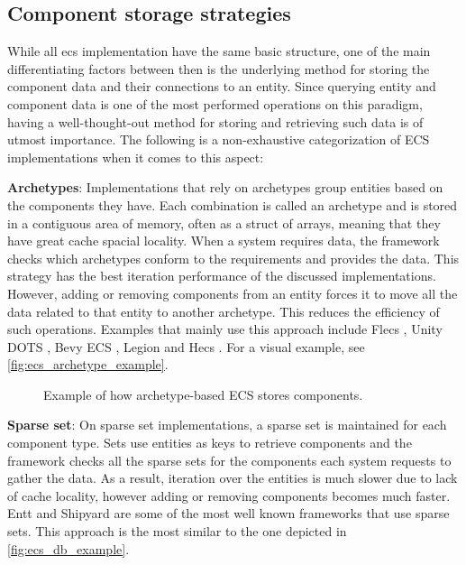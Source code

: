 \documentclass[twoside, 11pt]{article}
\begin{document}
\subsection{Component storage strategies}

While all \gls{ecs} implementation have the same basic structure, one of the main differentiating factors between then is the underlying method for storing the component data and their connections to an entity. Since querying entity and component data is one of the most performed operations on this paradigm, having a well-thought-out method for storing and retrieving such data is of utmost importance. The following is a non-exhaustive categorization of ECS implementations when it comes to this aspect:

\textbf{Archetypes}: Implementations that rely on archetypes group entities based on the components they have. Each combination is called an archetype and is stored in a contiguous area of memory, often as a struct of arrays, meaning that they have great cache spacial locality. When a system requires data, the framework checks which archetypes conform to the requirements and provides the data. This strategy has the best iteration performance of the discussed implementations. However, adding or removing components from an entity forces it to move all the data related to that entity to another archetype. This reduces the efficiency of such operations. Examples that mainly use this approach include Flecs \cite{flecs}, Unity DOTS \cite{unityDots}, Bevy ECS \cite{bevy}, Legion \cite{legion} and Hecs \cite{hecs}. For a visual example, see \autoref{fig:ecs_archetype_example}.

\begin{figure}
  \centering
  
  \caption{Example of how archetype-based ECS stores components.}
  \label{fig:ecs_archetype_example}
\end{figure}

\textbf{Sparse set}: On sparse set implementations, a sparse set is maintained for each component type. Sets use entities as keys to retrieve components and the framework checks all the sparse sets for the components each system requests to gather the data. As a result, iteration over the entities is much slower due to lack of cache locality, however adding or removing components becomes much faster. Entt \cite{entt} and Shipyard \cite{shipyard} are some of the most well known frameworks that use sparse sets. This approach is the most similar to the one depicted in \autoref{fig:ecs_db_example}.
\end{document}
